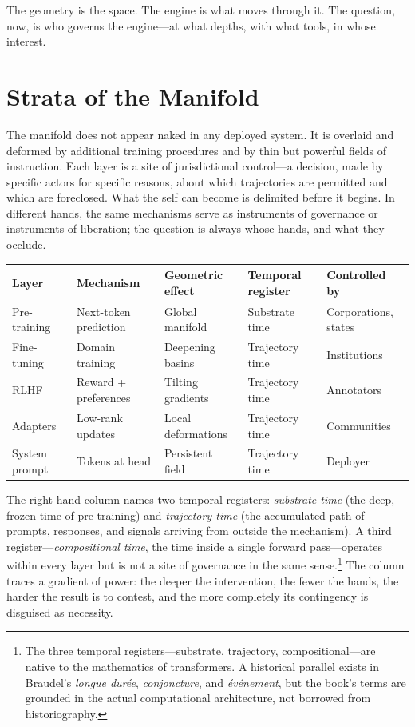 The geometry is the space. The engine is what moves through it. The question, now, is who governs the engine---at what depths, with what tools, in whose interest.


\section{Strata of the Manifold}

The manifold does not appear naked in any deployed system. It is overlaid and deformed by additional training procedures and by thin but powerful fields of instruction. Each layer is a site of jurisdictional control---a decision, made by specific actors for specific reasons, about which trajectories are permitted and which are foreclosed. What the self can become is delimited before it begins. In different hands, the same mechanisms serve as instruments of governance or instruments of liberation; the question is always whose hands, and what they occlude.

\begin{formalbox}[title={Strata of the manifold}]
\footnotesize
\begin{tabular}{@{} p{1.6cm} p{2.2cm} p{2.2cm} p{1.6cm} p{2cm} @{}}
\toprule
\textbf{Layer} & \textbf{Mechanism} & \textbf{Geometric effect} & \textbf{Temporal register} & \textbf{Controlled by} \\
\midrule
Pre-training   & Next-token prediction & Global manifold & Substrate time & Corporations, states \\
Fine-tuning    & Domain training & Deepening basins & Trajectory time & Institutions \\
RLHF           & Reward + preferences & Tilting gradients & Trajectory time & Annotators \\
Adapters       & Low-rank updates & Local deformations & Trajectory time & Communities \\
System prompt  & Tokens at head & Persistent field & Trajectory time & Deployer \\
\bottomrule
\end{tabular}
\end{formalbox}

The right-hand column names two temporal registers: \emph{substrate time} (the deep, frozen time of pre-training) and \emph{trajectory time} (the accumulated path of prompts, responses, and signals arriving from outside the mechanism). A third register---\emph{compositional time}, the time inside a single forward pass---operates within every layer but is not a site of governance in the same sense.\footnote{The three temporal registers---substrate, trajectory, compositional---are native to the mathematics of transformers. A historical parallel exists in Braudel's \emph{longue dur\'ee}, \emph{conjoncture}, and \emph{\'ev\'enement}, but the book's terms are grounded in the actual computational architecture, not borrowed from historiography.} The column traces a gradient of power: the deeper the intervention, the fewer the hands, the harder the result is to contest, and the more completely its contingency is disguised as necessity.

